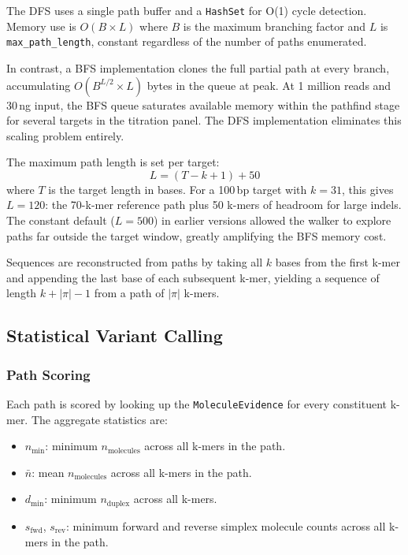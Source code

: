 The DFS uses a single path buffer and a \texttt{HashSet} for O(1) cycle detection.
Memory use is $O(B \times L)$ where $B$ is the maximum branching factor and $L$ is \texttt{max\_path\_length}, constant regardless of the number of paths enumerated.

In contrast, a BFS implementation clones the full partial path at every branch, accumulating $O(B^{L/2} \times L)$ bytes in the queue at peak.
At 1 million reads and 30\,ng input, the BFS queue saturates available memory within the pathfind stage for several targets in the titration panel.
The DFS implementation eliminates this scaling problem entirely.

The maximum path length is set per target:
\begin{equation}
  \label{eq:max-path-length}
  L = (T - k + 1) + 50
\end{equation}
\noindent where $T$ is the target length in bases.
For a 100\,bp target with $k = 31$, this gives $L = 120$: the 70-k-mer reference path plus 50 k-mers of headroom for large indels.
The constant default ($L = 500$) in earlier versions allowed the walker to explore paths far outside the target window, greatly amplifying the BFS memory cost.

Sequences are reconstructed from paths by taking all $k$ bases from the first k-mer and appending the last base of each subsequent k-mer, yielding a sequence of length $k + |\pi| - 1$ from a path of $|\pi|$ k-mers.

\subsection{Statistical Variant Calling}
\label{sec:method:calling}

\subsubsection{Path Scoring}

Each path is scored by looking up the \texttt{MoleculeEvidence} for every constituent k-mer.
The aggregate statistics are:

\begin{itemize}
  \item $n_\text{min}$: minimum $n_\text{molecules}$ across all k-mers in the path.
  \item $\bar{n}$: mean $n_\text{molecules}$ across all k-mers in the path.
  \item $d_\text{min}$: minimum $n_\text{duplex}$ across all k-mers.
  \item $s_\text{fwd}$, $s_\text{rev}$: minimum forward and reverse simplex molecule counts across all k-mers in the path.
\end{itemize}

